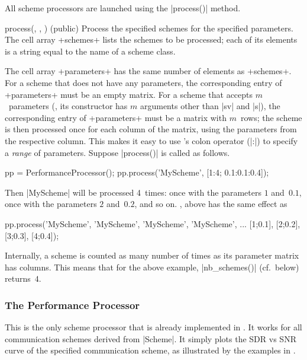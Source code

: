 All scheme processors are launched using the |process()| method.
\begin{method}{process(\obj, , ) (public)}
  Process the specified schemes for the specified parameters. The cell array
  +schemes+ lists the schemes to be processed; each of its elements is a string
  equal to the name of a scheme class.

  The cell array +parameters+ has the same number of elements as +schemes+. For
  a scheme that does not have any parameters, the corresponding entry of
  +parameters+ must be an empty matrix.  For a scheme that accepts
  $m$~parameters (\ie, its constructor has $m$ arguments other than |sv| and
  |s|), the corresponding entry of +parameters+ must be a matrix with
  $m$~rows; the scheme is then processed once for each
  column of the matrix, using the parameters from the respective column.
  This makes it easy to use \matlab's colon operator (|:|) to specify a
  \emph{range} of parameters.
  \codeexample Suppose |process()| is called as follows.
  \begin{Code}
  pp = PerformanceProcessor();
  pp.process({'MyScheme'}, {[1:4; 0.1:0.1:0.4]});
  \end{Code}
  Then |MyScheme| will be processed 4~times: once with the parameters $1$
  and~$0.1$, once with the parameters $2$ and~$0.2$, and so on. \Ie, 
  above has the same effect as
  \begin{Code}
  pp.process({'MyScheme', 'MyScheme', 'MyScheme', 'MyScheme'}, ...
    {[1;0.1], [2;0.2], [3;0.3], [4;0.4]});
  \end{Code}

  Internally, a scheme is counted as many number of times as its parameter
  matrix has columns. This means that for the above example, |nb_schemes()|
  (cf.~below) returns~$4$.

\end{method}


\subsubsection{The Performance Processor}

This is the only scheme processor that is already implemented in \jscsim. It
works for all communication schemes derived from |Scheme|. It simply plots the
SDR vs SNR curve of the specified communication scheme, as illustrated by the
examples in .

